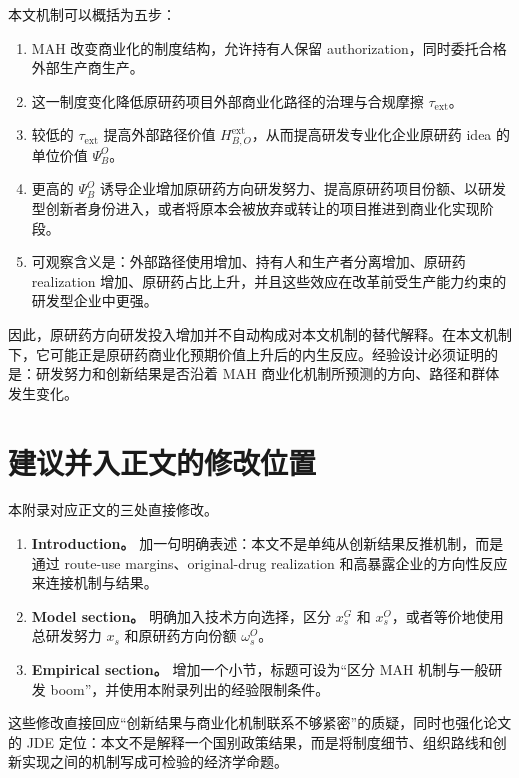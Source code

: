 \documentclass[12pt]{article}
\newcommand{\tauext}{\tau_{\mathrm{ext}}}
\begin{document}
本文机制可以概括为五步：
\begin{enumerate}
    \item MAH 改变商业化的制度结构，允许持有人保留 authorization，同时委托合格外部生产商生产。
    \item 这一制度变化降低原研药项目外部商业化路径的治理与合规摩擦 $\tauext$。
    \item 较低的 $\tauext$ 提高外部路径价值 $H_{B,O}^{\mathrm{ext}}$，从而提高研发专业化企业原研药 idea 的单位价值 $\Psi_B^O$。
    \item 更高的 $\Psi_B^O$ 诱导企业增加原研药方向研发努力、提高原研药项目份额、以研发型创新者身份进入，或者将原本会被放弃或转让的项目推进到商业化实现阶段。
    \item 可观察含义是：外部路径使用增加、持有人和生产者分离增加、原研药 realization 增加、原研药占比上升，并且这些效应在改革前受生产能力约束的研发型企业中更强。
\end{enumerate}

因此，原研药方向研发投入增加并不自动构成对本文机制的替代解释。在本文机制下，它可能正是原研药商业化预期价值上升后的内生反应。经验设计必须证明的是：研发努力和创新结果是否沿着 MAH 商业化机制所预测的方向、路径和群体发生变化。

\section{建议并入正文的修改位置}

本附录对应正文的三处直接修改。
\begin{enumerate}
    \item \textbf{Introduction。} 加一句明确表述：本文不是单纯从创新结果反推机制，而是通过 route-use margins、original-drug realization 和高暴露企业的方向性反应来连接机制与结果。
    \item \textbf{Model section。} 明确加入技术方向选择，区分 $x_s^G$ 和 $x_s^O$，或者等价地使用总研发努力 $x_s$ 和原研药方向份额 $\omega_s^O$。
    \item \textbf{Empirical section。} 增加一个小节，标题可设为“区分 MAH 机制与一般研发 boom”，并使用本附录列出的经验限制条件。
\end{enumerate}

这些修改直接回应“创新结果与商业化机制联系不够紧密”的质疑，同时也强化论文的 JDE 定位：本文不是解释一个国别政策结果，而是将制度细节、组织路线和创新实现之间的机制写成可检验的经济学命题。
\end{document}
